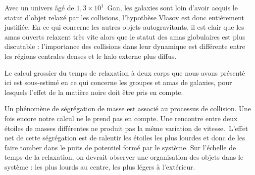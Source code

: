 Avec un univers \^{a}g\'{e} de $1,3\times10^{1}$\ Gan, les galaxies sont loin
d'avoir acquis le statut d'objet relax\'{e} par les collisions,
l'hypoth\`{e}se Vlasov est donc enti\`{e}rement justifi\'{e}e. En ce qui
concerne les autres objets autogravitants, il est clair que les amas ouverts
relaxent tr\`{e}s vite alors que le statut des amas globulaires est plus
discutable : l'importance des collisions dans leur dynamique est
diff\'{e}rente entre les r\'{e}gions centrales denses et le halo externe plus diffus.

Le calcul grossier du temps de relaxation \`{a} deux corps que nous avons
pr\'{e}sent\'{e} ici est sous-estim\'{e} en ce qui concerne les groupes et
amas de galaxies, pour lesquels l'effet de la mati\`{e}re noire doit \^{e}tre
pris en compte.

Un ph\'{e}nom\`{e}ne de s\'{e}gr\'{e}gation de masse est associ\'{e} au
processus de collision. Une fois encore notre calcul ne le prend pas en
compte. Une rencontre entre deux \'{e}toiles de masses diff\'{e}rentes ne
produit pas la m\^{e}me variation de vitesse.\ L'effet net de cette
s\'{e}gr\'{e}gation est de ralentir les \'{e}toiles les plus lourdes et donc
de les faire tomber dans le puits de potentiel form\'{e} par le syst\`{e}me.
Sur l'\'{e}chelle de temps de la relaxation, on devrait observer une
organisation des objets dans le syst\`{e}me : les plus lourds au centre, les
plus l\'{e}gers \`{a} l'ext\'{e}rieur.
